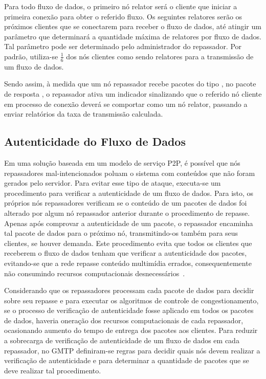 Para todo fluxo de dados, o primeiro nó relator será o cliente que iniciar a primeira conexão para obter o referido fluxo. Os seguintes relatores serão os próximos clientes que se conectarem para receber o fluxo de dados, até atingir um parâmetro que determinará a quantidade máxima de relatores por fluxo
de dados. Tal parâmetro pode ser determinado pelo administrador do repassador. 
Por padrão, utiliza-se $\frac{1}{6}$ dos nós clientes como sendo relatores para a transmissão de um fluxo
de dados.

Sendo assim, à medida que um nó repassador recebe pacotes do tipo , no pacote de resposta , o repassador ativa um indicador sinalizando que o referido nó cliente em processo de conexão deverá se comportar como um nó relator, passando a enviar relatórios da taxa de transmissão calculada.

\subsection{Autenticidade do Fluxo de Dados}
\label{sec:autenticidade}

Em uma solução baseada em um modelo de serviço P2P, é possível que nós repassadores mal-intencionados  poluam o sistema com conteúdos que não foram gerados pelo servidor.
Para evitar esse tipo de ataque, executa-se um procedimento para verificar a autenticidade de um fluxo de dados. Para isto, os próprios nós repassadores verificam se o conteúdo de um pacotes de dados foi alterado por algum nó repassador anterior durante o procedimento de repasse. Apenas após comprovar a autenticidade de um pacote, o repassador encaminha tal pacote de dados para o próximo nó, transmitindo-os também para seus clientes, se houver demanda. Este procedimento evita que todos os clientes que receberem o fluxo de dados tenham que verificar a autenticidade dos pacotes, evitando-se que a rede repasse conteúdo multimídia errados, consequentemente não consumindo recursos computacionais desnecessários~\cite{sales2014gmtp}.

Considerando que os repassadores processam cada pacote de dados para decidir sobre seu repasse e para executar os algoritmos de controle de congestionamento, se o processo de verificação de autenticidade fosse aplicado em todos os pacotes de dados, haveria oneração dos recursos computacionais de cada repassador, ocasionando aumento do tempo de entrega dos pacotes aos clientes.
Para reduzir a sobrecarga de verificação de autenticidade de um fluxo de dados em cada repassador, no GMTP definiram-se regras para decidir quais nós devem realizar a verificação de autenticidade e para determinar a quantidade de pacotes que se deve realizar tal procedimento.


